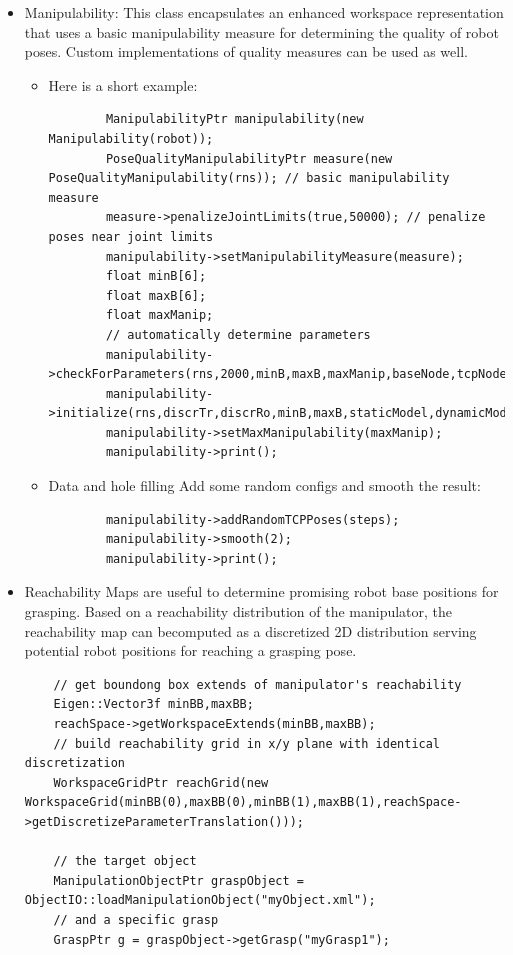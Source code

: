 \begin{itemize}
\item Manipulability: This class encapsulates an enhanced workspace representation that uses a basic manipulability measure for determining the quality of robot poses. Custom implementations of quality measures can be used as well.  
\begin{itemize}
\item Here is a short example: 
     \begin{lstlisting}
        ManipulabilityPtr manipulability(new Manipulability(robot));
        PoseQualityManipulabilityPtr measure(new PoseQualityManipulability(rns)); // basic manipulability measure
        measure->penalizeJointLimits(true,50000); // penalize poses near joint limits
        manipulability->setManipulabilityMeasure(measure);
        float minB[6];
        float maxB[6];
        float maxManip;
        // automatically determine parameters
        manipulability->checkForParameters(rns,2000,minB,maxB,maxManip,baseNode,tcpNode);
        manipulability->initialize(rns,discrTr,discrRo,minB,maxB,staticModel,dynamicModel,baseNode,tcpNode);
        manipulability->setMaxManipulability(maxManip);
        manipulability->print();  
        \end{lstlisting}
\item Data and hole filling 
Add some random configs and smooth the result: 
     \begin{lstlisting}
        manipulability->addRandomTCPPoses(steps);
        manipulability->smooth(2);
        manipulability->print();  
        \end{lstlisting}
\end{itemize}
\item Reachability Maps are useful to determine promising robot base positions for grasping. Based on a reachability distribution of the manipulator, the reachability map can becomputed as a discretized 2D distribution serving potential robot positions for reaching a grasping pose. 
\begin{lstlisting}
    // get boundong box extends of manipulator's reachability 
    Eigen::Vector3f minBB,maxBB;
    reachSpace->getWorkspaceExtends(minBB,maxBB);
    // build reachability grid in x/y plane with identical discretization
    WorkspaceGridPtr reachGrid(new WorkspaceGrid(minBB(0),maxBB(0),minBB(1),maxBB(1),reachSpace->getDiscretizeParameterTranslation()));

    // the target object 
    ManipulationObjectPtr graspObject = ObjectIO::loadManipulationObject("myObject.xml");
    // and a specific grasp
    GraspPtr g = graspObject->getGrasp("myGrasp1");


\end{lstlisting}
\end{itemize}
